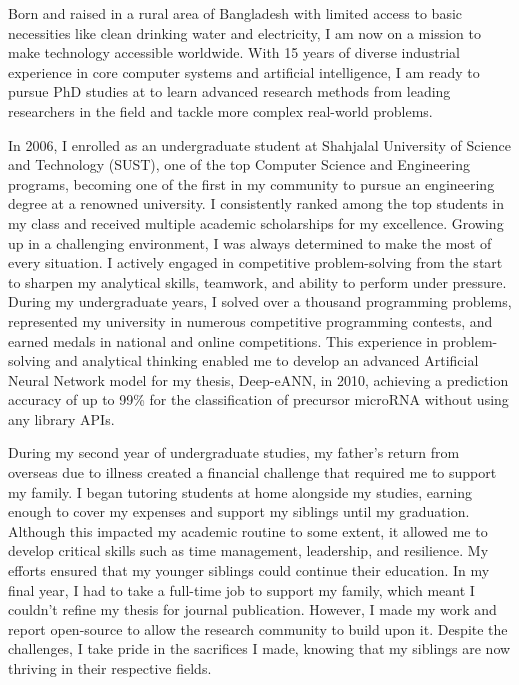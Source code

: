 
Born and raised in a rural area of Bangladesh with limited access to basic necessities like clean drinking water and electricity,
I am now on a mission to make technology accessible worldwide.
With 15 years of diverse industrial experience in core computer systems and artificial intelligence,
I am ready to pursue PhD studies at {\GetUniversityName} to learn advanced research methods from leading researchers in the field
and tackle more complex real-world problems.

In 2006, I enrolled as an undergraduate student at Shahjalal University of Science and Technology (SUST),
one of the top Computer Science and Engineering programs, becoming one of the first in my community
to pursue an engineering degree at a renowned university.
I consistently ranked among the top students in my class and received multiple academic scholarships for my excellence.
Growing up in a challenging environment, I was always determined to make the most of every situation.
I actively engaged in competitive problem-solving from the start to sharpen my analytical skills, teamwork,
and ability to perform under pressure.
During my undergraduate years, I solved over a thousand programming problems, represented my university
in numerous competitive programming contests, and earned medals in national and online competitions.
This experience in problem-solving and analytical thinking enabled me to develop an advanced Artificial Neural Network
model for my thesis, Deep-eANN, in 2010, achieving a prediction accuracy of up to 99\% for the classification
of precursor microRNA without using any library APIs.

During my second year of undergraduate studies, my father’s return from overseas due to illness
created a financial challenge that required me to support my family.
I began tutoring students at home alongside my studies, earning enough to cover my expenses
and support my siblings until my graduation.
Although this impacted my academic routine to some extent, it allowed me to develop critical skills
such as time management, leadership, and resilience.
My efforts ensured that my younger siblings could continue their education.
In my final year, I had to take a full-time job to support my family, which meant I couldn't refine my thesis
for journal publication.
However, I made my work and report open-source to allow the research community to build upon it.
Despite the challenges, I take pride in the sacrifices I made, knowing that my siblings are now thriving
in their respective fields.

